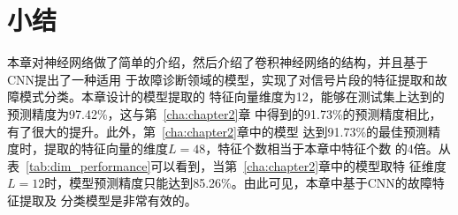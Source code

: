 \section{小结}

本章对神经网络做了简单的介绍，然后介绍了卷积神经网络的结构，并且基于CNN提出了一种适用
于故障诊断领域的模型，实现了对信号片段的特征提取和故障模式分类。本章设计的模型提取的
特征向量维度为12，能够在测试集上达到的预测精度为97.42\%，这与第~\ref{cha:chapter2}章
中得到的91.73\%的预测精度相比，有了很大的提升。此外，第~\ref{cha:chapter2}章中的模型
达到91.73\%的最佳预测精度时，提取的特征向量的维度$L=48$，特征个数相当于本章中特征个数
的4倍。从表~\ref{tab:dim_performance}可以看到，当第~\ref{cha:chapter2}章中的模型取特
征维度$L=12$时，模型预测精度只能达到85.26\%。由此可见，本章中基于CNN的故障特征提取及
分类模型是非常有效的。
